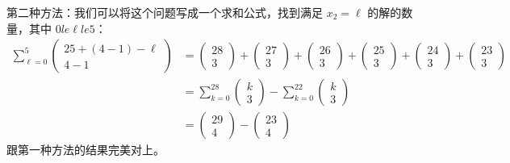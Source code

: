 \begin{example}
\begin{enumerate}[label=(\arabic*)]
              第二种方法：我们可以将这个问题写成一个求和公式，找到满足 $x_2 = \ell$ 的解的数量，其中 $0 le \ell le 5$：
              \begin{align*}
                  \sum_{\ell=0}^{5} \begin{pmatrix}25+(4-1)-\ell\\4-1\end{pmatrix} & = \begin{pmatrix}28\\3\end{pmatrix}+\begin{pmatrix}27\\3\end{pmatrix}+\begin{pmatrix}26\\3\end{pmatrix}+\begin{pmatrix}25\\3\end{pmatrix}+\begin{pmatrix}24\\3\end{pmatrix}+\begin{pmatrix}23\\3\end{pmatrix} \\
                                                                                   & = \sum_{k=0}^{28}\begin{pmatrix}k\\3\end{pmatrix}-\sum_{k=0}^{22}\begin{pmatrix}k\\3\end{pmatrix}                                                                                                             \\
                                                                                   & = \begin{pmatrix}29\\4\end{pmatrix}-\begin{pmatrix}23\\4\end{pmatrix}
              \end{align*}
              跟第一种方法的结果完美对上。
    \end{enumerate}
\end{example}